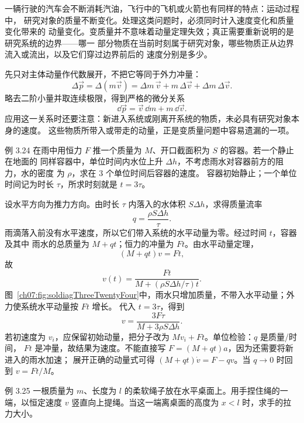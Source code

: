 一辆行驶的汽车会不断消耗汽油，飞行中的飞机或火箭也有同样的特点：运动过程中，
研究对象的质量不断变化。处理这类问题时，必须同时计入速度变化和质量变化带来的
动量变化。变质量并不意味着动量定理失效；真正需要重新说明的是研究系统的边界——哪一
部分物质在当前时刻属于研究对象，哪些物质正从边界流入或流出，以及它们穿过边界前后的
速度分别是多少。

先只对主体动量作代数展开，不把它等同于外力冲量：
\begin{equation}
 \Delta\vec p=\Delta(m\vec v)
 =\Delta m\,\vec v+m\,\Delta\vec v+\Delta m\,\Delta\vec v.
\end{equation}
略去二阶小量并取连续极限，得到严格的微分关系
\[
 \dd\vec p=\vec v\,\dd m+m\,\dd\vec v.
\]
应用这一关系时还要注意：新进入系统或刚离开系统的物质，未必具有研究对象本身的速度。
这些物质所带入或带走的动量，正是变质量问题中容易遗漏的一项。



\begin{origexamplebox}{例 3.24}
在雨中用恒力 $F$ 推一个质量为 $M$、开口截面积为 $S$ 的容器。若一个静止在地面的
同样容器中，单位时间内水位上升 $\Delta h$，不考虑雨水对容器前方的阻力，水的密度
为 $\rho$，求在 $3$ 个单位时间后容器的速度。
容器初始静止；一个单位时间记为时长 $\tau$，所求时刻就是 $t=3\tau$。
\end{origexamplebox}

\begin{xesolution}
设水平方向为推力方向。由时长 $\tau$ 内落入的水体积 $S\Delta h$，求得质量流率
\[
 q=\frac{\rho S\Delta h}{\tau}.
\]
雨滴落入前没有水平速度，所以它们带入系统的水平动量为零。经过时间 $t$，容器及其中
雨水的总质量为 $M+qt$；恒力的冲量为 $Ft$。由水平动量定理，
\[
 (M+qt)v=Ft,
\]
故
\[
 v(t)=\frac{Ft}{M+(\rho S\Delta h/\tau)t}.
\]
图~\ref{ch07:fig:soldiagThreeTwentyFour}中，雨水只增加质量，不带入水平动量；外力使系统水平动量按 $Ft$ 增长。
\soldiagThreeTwentyFour
代入 $t=3\tau$，得到
\[
 \boxed{v=\frac{3F\tau}{M+3\rho S\Delta h}}.
\]
若初速度为 $v_i$，应保留初始动量，把分子改为 $Mv_i+Ft$。单位检验：$q$ 是质量/时间，
$Ft$ 是冲量，故结果为速度。不能直接写 $F=(M+qt)a$，因为还需要将新进入的雨水加速；
展开正确的动量式可得 $(M+qt)\dot v=F-qv$。当 $q\to0$ 时回到 $v=Ft/M$。
\end{xesolution}

\begin{origexamplebox}{例 3.25}
一根质量为 $m$、长度为 $l$ 的柔软绳子放在水平桌面上。用手捏住绳的一端，以恒定速度
$v$ 竖直向上提绳。当这一端离桌面的高度为 $x<l$ 时，求手的拉力大小。
\end{origexamplebox}

